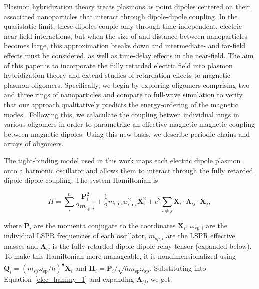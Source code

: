 \documentclass[journal=apchd5,manuscript=article]{achemso}
\begin{document}
Plasmon hybridization theory treats plasmons as point dipoles centered on their associated nanoparticles that interact through dipole-dipole coupling. In the quasistatic limit, these dipoles couple only through time-independent, electric near-field interactions\cite{jackson_classical_1999}, but when the size of and distance between nanoparticles becomes large, this approximation breaks down and intermediate- and far-field effects must be considered, as well as time-delay effects in the near-field\cite{jackson_classical_1999}. The aim of this paper is to incorporate the fully retarded electric field into plasmon hybridization theory and extend studies of retardation effects to magnetic plasmon oligomers. Specifically, we begin by exploring oligomers comprising two and three rings of nanoparticles and compare to full-wave simulation \cite{Hohenester2012} to verify that our approach qualitatively predicts the energy-ordering of the magnetic modes.\cite{Cherqui2014,Cherqui2016}. Following this, we calaculate the coupling betwen individual rings in various oligomers in order to parametrize an effective magnetic-magnetic coupling between magnetic dipoles. Using this new basis, we describe periodic chains and arrays of oligomers.


The tight-binding model used in this work maps each electric dipole plasmon onto a harmonic oscillator and allows them to interact through the fully retarded dipole-dipole coupling. The system Hamiltonian is

\begin{equation}
H = \sum_{i}^{n}\frac{\textbf{P}_{i}^{2}}{2m_{\textrm{sp},i}} + \frac{1}{2}m_{\textrm{sp},i}w_{\textrm{sp},i}^2\textbf{X}_{i}^{2} + e^2\sum_{i\neq j}\textbf{X}_i\cdot\boldsymbol{\Lambda}_{ij}\cdot\textbf{X}_j,\label{elec_hammy_1}
\end{equation}

where $\textbf{P}_i$ are the momenta conjugate to the coordinates $\textbf{X}_{i}$, $\omega_{sp,i}$ are the individual LSPR frequencies of each oscillator, $m_{sp,i}$ are the LSPR effective masses and $\boldsymbol{\Lambda}_{ij}$ is the fully retarded dipole-dipole relay tensor (expanded below). To make this Hamiltonian more manageable, it is nondimensionalized using $\textbf{Q}_i = \left(m_{\textrm{sp}}\omega_{\textrm{sp}}/\hbar\right)^{\frac{1}{2}}\textbf{X}_i$ and $\boldsymbol{\Pi}_i = \textbf{P}_i/\sqrt{\hbar m_{\textrm{sp}}\omega_{\textrm{sp}}}$. Substituting into Equation~\ref{elec_hammy_1} and expanding $\boldsymbol{\Lambda}_{ij}$, we get:
\end{document}
